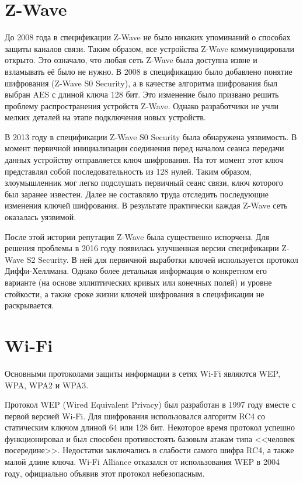 	
	\section{Z-Wave}
	До 2008 года в спецификации Z-Wave не было никаких упоминаний о способах защиты каналов связи. 
	Таким образом, все устройства Z-Wave коммуницировали открыто. Это означало, что любая сеть Z-Wave 
	была доступна извне и взламывать её было не нужно. В 2008 в спецификацию было добавлено понятие 
	шифрования (Z-Wave S0 Security), а в качестве алгоритма шифрования был выбран AES с длиной ключа 128 бит. 
	Это изменение было призвано решить проблему распространения устройств Z-Wave. Однако разработчики
	не учли мелких деталей на этапе подключения новых устройств.
	
	В 2013 году в спецификации  Z-Wave S0 Security была обнаружена уязвимость. В момент первичной 
	инициализации соединения перед началом сеанса передачи данных устройству отправляется ключ шифрования.
	На тот момент этот ключ представлял собой последовательность из 128 нулей. Таким образом, злоумышленник
	мог легко подслушать первичный сеанс связи, ключ которого был заранее известен. Далее не
	составляло труда отследить последующие изменения ключей шифрования. В результате практически
	каждая Z-Wave сеть оказалась уязвимой.
	
	После этой истории репутация Z-Wave была существенно испорчена. Для решения проблемы в 2016 году
	появилась улучшенная версии спецификации Z-Wave S2 Security. В ней для первичной выработки ключей
	используется протокол Диффи-Хеллмана. Однако более детальная информация о конкретном его варианте
	(на основе эллиптических кривых или конечных полей) и уровне стойкости, а также сроке жизни ключей
	шифрования в спецификации не раскрывается.
	
	
	\section{Wi-Fi}
	Основными протоколами защиты информации в сетях Wi-Fi являются WEP, WPA, WPA2 и WPA3.
	
	Протокол WEP (Wired Equivalent Privacy) был разработан в 1997 году вместе с первой версией Wi-Fi.
	Для шифрования использовался алгоритм RC4 со статическим ключом длиной 64 или 128 бит. Некоторое время
	протокол успешно функционировал и был способен противостоять базовым атакам типа <<человек посередине>>.
	Недостатки заключались в слабости самого шифра RC4, а также малой длине ключа. Wi-Fi Alliance отказался 
	от использования WEP в 2004 году, официально объявив этот протокол небезопасным.
	
